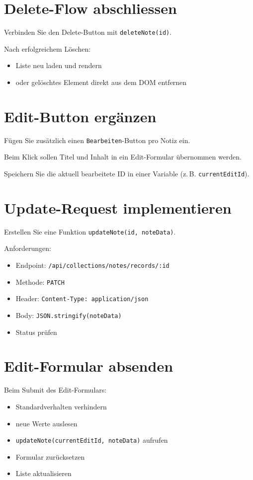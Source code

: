 \documentclass[a4paper,12pt]{article}
\begin{document}
\section{Delete-Flow abschliessen}

Verbinden Sie den Delete-Button mit \texttt{deleteNote(id)}.

Nach erfolgreichem Löschen:
\begin{itemize}
    \item Liste neu laden und rendern
    \item oder gelöschtes Element direkt aus dem DOM entfernen
\end{itemize}

\section{Edit-Button ergänzen}

Fügen Sie zusätzlich einen \texttt{Bearbeiten}-Button pro Notiz ein.

Beim Klick sollen Titel und Inhalt in ein Edit-Formular übernommen werden.

Speichern Sie die aktuell bearbeitete ID in einer Variable (z.\,B. \texttt{currentEditId}).

\section{Update-Request implementieren}

Erstellen Sie eine Funktion \texttt{updateNote(id, noteData)}.

Anforderungen:
\begin{itemize}
    \item Endpoint: \texttt{/api/collections/notes/records/:id}
    \item Methode: \texttt{PATCH}
    \item Header: \texttt{Content-Type: application/json}
    \item Body: \texttt{JSON.stringify(noteData)}
    \item Status prüfen
\end{itemize}

\section{Edit-Formular absenden}

Beim Submit des Edit-Formulars:
\begin{itemize}
    \item Standardverhalten verhindern
    \item neue Werte auslesen
    \item \texttt{updateNote(currentEditId, noteData)} aufrufen
    \item Formular zurücksetzen
    \item Liste aktualisieren
\end{itemize}
\end{document}
